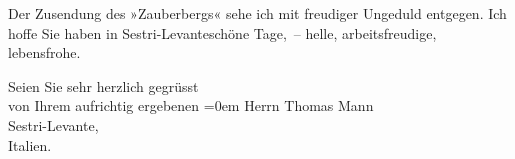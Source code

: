\pstart
           Der Zusendung des »Zauberbergs« sehe ich mit
               freudiger Ungeduld entgegen. Ich hoffe Sie haben in Sestri-Levanteschöne Tage, – helle, arbeitsfreudige,
               lebensfrohe.\pend
           
\pstart
           Seien Sie sehr herzlich gegrüsst{\\[\baselineskip]}von Ihrem aufrichtig ergebenen\pend
           \leftskip=0em{}
\pstart
           \noindent{}Herrn Thomas Mann{\\}Sestri-Levante,{\\}Italien.\pend
           \endnumbering{}  
      